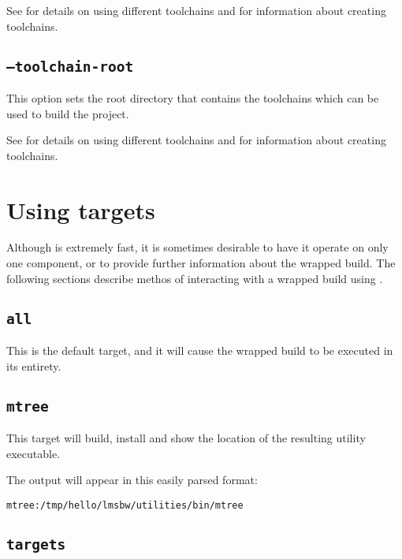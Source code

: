 See  for details on using different
toolchains and  for information
about creating toolchains.

\subsection{\texttt{--toolchain-root}}\label{usinglmsbw:toolchain-root}

This option sets the root directory that contains the toolchains which
can be used to build the project.

See  for details on using different
toolchains and  for information
about creating toolchains.

\section{Using \lmsbw targets}\label{lmsbw:target:verbs}

Although \lmsbw is extremely fast, it is sometimes desirable to have
it operate on only one component, or to provide further information
about the wrapped build.  The following sections describe methos of
interacting with a wrapped build using \lmsbw.

\subsection{\texttt{all}}\label{lmsbw:target:all}

This is the default target, and it will cause the wrapped build to be
executed in its entirety.

\subsection{\texttt{mtree}}

This target will build, install and show the location of the resulting
\mtree utility executable.

The output will appear in this easily parsed format:

\begin{verbatim}
mtree:/tmp/hello/lmsbw/utilities/bin/mtree
\end{verbatim}

\subsection{\texttt{targets}}

